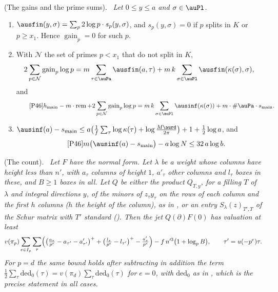 \documentclass[10pt]{amsart}
\theoremstyle{definition}
\theoremstyle{remark}
\providecommand{\augain}{\operatorname{gain}}
\providecommand{\auhmain}{h_{\mathrm{main}}}
\providecommand{\aurem}{\operatorname{rem}}
\providecommand{\ausmain}{s_{\mathrm{main}}}
\newenvironment{quotedthm}[2]{\par\medskip\noindent\begingroup
  \textbf{#1}#2.\ \itshape\ignorespaces}{\endgroup\par\medskip}
\begin{document}
\begin{quotedthm}{\cite[Lemma~14.9]{P46}}{ (The gains and the prime sums)}
Let $0\le y\le a$ and $\sigma\in\auPl$.
\begin{enumerate}
\item[(a)] $\ausfin(y,\sigma)=\sum_p2\log p\cdot s_p(y,\sigma)$, and $s_p(y,\sigma)=0$ if $p$
splits in $K$ or $p\ge x_1$. Hence $\augain_p=0$ for such $p$.
\item[(b)] With $\mathcal N$ the set of primes $p<x_1$ that do not split in $K$,
\[
2\sum_{p\in\mathcal N}\augain_p\log p=m\sum_{\tau\in\auPa}\ausfin(a,\tau)+m\,k\sum_{\sigma\in\auPl}
\ausfin(\kappa(\sigma),\sigma),
\]
and
\begin{equation*}\tag*{{\cite[(42)]{P46}}}
\auhmain-m\cdot\aurem+2\sum_{p\in\mathcal N}\augain_p\log p=m\,k\sum_{\sigma\in\auPl}\ausinf
(\kappa(\sigma))+m\cdot\#\auPa\cdot\ausmain .
\end{equation*}
\item[(c)] $\ausinf(a)-\ausmain\le a\bigl(\tfrac1f\sum_\tau\log\kappa(\tau)+\log\frac{M\aurd}
{2\pi}\bigr)+1+\tfrac12\log a$, and
\begin{equation*}\tag*{{\cite[(43)]{P46}}}
m\bigl(\ausinf(a)-\ausmain\bigr)-a\log N\le32\,a\log b .
\end{equation*}
\end{enumerate}
\end{quotedthm}

\begin{quotedthm}{\cite[Proposition~14.10]{P46}}{ (The count)}
Let $F$ have the normal form. Let $\lambda$ be a weight whose columns have height less than $n'$, with $a_\tau$ columns of
height $1$, $a'_\tau$ other columns and $l_\tau$ boxes in these, and $B\ge1$ boxes in all. Let $Q$ be either
the product $Q_{T,y}$, for a filling $T$ of $\lambda$ and integral directions $y$, of the minors of
$z_\tau y_\tau$ on the rows of each column and the first $h$ columns ($h$ the height of the column),
as in {\cite[Proposition~4.1]{P49}}, or an entry $S_\lambda(z)_{T',T}$ of the Schur matrix with $T'$
standard ({\cite[Lemma~4.4]{P49}}). Then the jet
$Q(\partial)F(0)$ has valuation at least
\[
v(\pi_p)\sum_{e\in I_p}\sum_{\tau}\Bigl(\bigl(\tfrac{a_\tau}{p^e}-a_{\tau'}-a'_{\tau'}\bigr)^+
+\bigl(\tfrac{l_\tau}{p^e}-l_{\tau'}\bigr)^+-\tfrac{a'_\tau}{p^e}\Bigr)-f\,n'^3\bigl(1+\log_p
B\bigr),\qquad\tau'=u(-p^e)\tau.
\]
For $p=d$ the same bound holds after subtracting in
addition the term $\tfrac12\sum_\tau\mathrm{ded}_0(\tau)=v(\pi_d)\sum_\tau\mathrm{ded}_0(\tau)$ for $e=0$, with
$\mathrm{ded}_0$ as in {\cite[Proposition~4.1]{P49}}, which is the precise statement in all cases.
\end{quotedthm}
\end{document}
